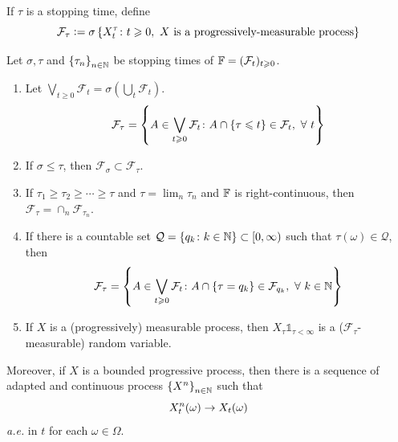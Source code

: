 \documentclass[a4paper,12pt]{article}
\begin{document}
\begin{itemize}
  \noindent If $\tau$ is a stopping time, define
  \begin{equation*}
    \mathcal{F}_{\tau} \vcentcolon= \sigma\left\{X_t^{\tau} \colon t\geqslant 0,~X\text{ is a progressively-measurable process}\right\}
  \end{equation*}
  \begin{prop}
    Let $\sigma, \tau$ and $\left\{\tau_n\right\}_{n \in \mathbb{N}}$ be stopping times of $\mathbb{F} =(\mathcal{F}_t)_{t\geqslant 0}$.
    \begin{enumerate}[label=(\arabic*)]
      \item Let $\bigvee_{t \geqslant 0} \mathcal{F}_t=\sigma(\bigcup_t\mathcal{F}_t)$.
      \begin{equation*}
        \mathcal{F}_{\tau} =\left\{A \in \bigvee_{t \geqslant 0} \mathcal{F}_t \colon A \cap \left\{\tau \leqslant t\right\} \in \mathcal{F}_t,~\forall~t \right\}
      \end{equation*}
      \item If $\sigma \leqslant \tau$, then $\mathcal{F}_{\sigma} \subset \mathcal{F}_{\tau}$.
      \item If $\tau_1\geqslant \tau_2 \geqslant \cdots \geqslant \tau$ and $\tau = \lim_{n}\tau_n$ and $\mathbb{F}$ is right-continuous, then $\mathcal{F}_{\tau} = \cap_n\mathcal{F}_{\tau_n}$.
      \item If there is a countable set $\mathcal{Q} = \left\{q_k \colon k \in \mathbb{N}\right\} \subset [0,\infty)$ such that $\tau(\omega) \in \mathcal{Q}$, then
      \begin{equation*}
        \mathcal{F}_{\tau} =\left\{A \in \bigvee_{t \geqslant 0} \mathcal{F}_t \colon A \cap \left\{\tau = q_k\right\} \in \mathcal{F}_{q_k},~\forall~k \in \mathbb{N}\right\}
      \end{equation*}
      \item If $X$ is a (progressively) measurable process, then $X_{\tau}\mathds{1}_{\tau < \infty}$ is a ($\mathcal{F}_{\tau}$-measurable) random variable.
    \end{enumerate}
  \end{prop}

  \noindent Moreover, if $X$ is a bounded progressive process, then there is a sequence of adapted and continuous process $\left\{X^n\right\}_{n\in \mathbb{N}}$ such that
  \begin{equation*}
    X^n_t(\omega) \rightarrow X_t(\omega)
  \end{equation*}
  \emph{a.e.} in $t$ for each $\omega \in \Omega$.
\end{itemize}
\end{document}
